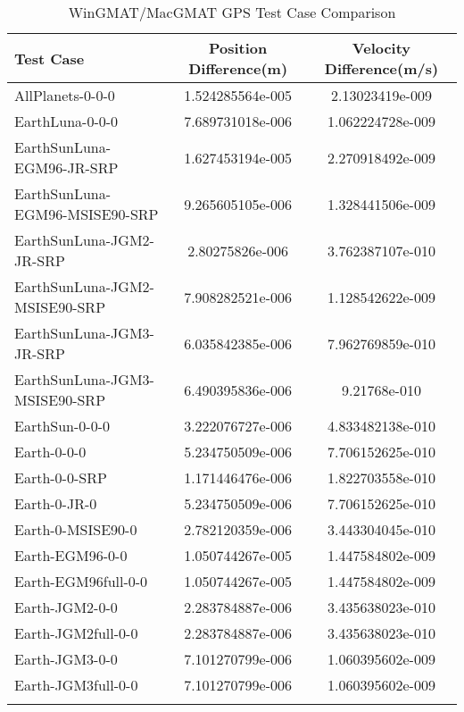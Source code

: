\begin{table}[htbp!]
\centering
\caption{ WinGMAT/MacGMAT GPS Test Case Comparison}
      \begin{tabular}{lcc}
      \hline\hline
          Test Case & Position Difference(m) & Velocity Difference(m/s) \\
         \hline
         AllPlanets-0-0-0 & 1.524285564e-005 & 2.13023419e-009 \\
         EarthLuna-0-0-0 & 7.689731018e-006 & 1.062224728e-009 \\
         EarthSunLuna-EGM96-JR-SRP & 1.627453194e-005 & 2.270918492e-009 \\
         EarthSunLuna-EGM96-MSISE90-SRP & 9.265605105e-006 & 1.328441506e-009 \\
         EarthSunLuna-JGM2-JR-SRP & 2.80275826e-006 & 3.762387107e-010 \\
         EarthSunLuna-JGM2-MSISE90-SRP & 7.908282521e-006 & 1.128542622e-009 \\
         EarthSunLuna-JGM3-JR-SRP & 6.035842385e-006 & 7.962769859e-010 \\
         EarthSunLuna-JGM3-MSISE90-SRP & 6.490395836e-006 & 9.21768e-010 \\
         EarthSun-0-0-0 & 3.222076727e-006 & 4.833482138e-010 \\
         Earth-0-0-0 & 5.234750509e-006 & 7.706152625e-010 \\
         Earth-0-0-SRP & 1.171446476e-006 & 1.822703558e-010 \\
         Earth-0-JR-0 & 5.234750509e-006 & 7.706152625e-010 \\
         Earth-0-MSISE90-0 & 2.782120359e-006 & 3.443304045e-010 \\
         Earth-EGM96-0-0 & 1.050744267e-005 & 1.447584802e-009 \\
         Earth-EGM96full-0-0 & 1.050744267e-005 & 1.447584802e-009 \\
         Earth-JGM2-0-0 & 2.283784887e-006 & 3.435638023e-010 \\
         Earth-JGM2full-0-0 & 2.283784887e-006 & 3.435638023e-010 \\
         Earth-JGM3-0-0 & 7.101270799e-006 & 1.060395602e-009 \\
         Earth-JGM3full-0-0 & 7.101270799e-006 & 1.060395602e-009 \\
      \hline\hline
      \label{Table: GPS WinGMAT-MacGMAT Table} 
\end{tabular}
\end{table}
